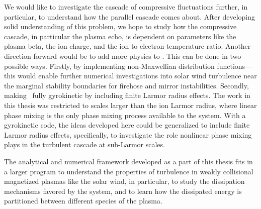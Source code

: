 We would like to investigate the cascade of compressive fluctuations further, in
particular, to understand how the parallel cascade comes about.
After developing solid understanding of this problem, we hope to study how the compressive cascade, in
particular the plasma echo, is dependent on parameters like the plasma beta, the ion
charge, and the ion to
electron temperature ratio. Another direction forward would be to add more physics to
\Gand. This can be done in two possible ways. Firstly, by implementing non-Maxwellian
distribution functions---this would enable 
further numerical investigations into solar wind turbulence near the marginal stability
boundaries for firehose and mirror instabilities. Secondly, making \Gand\ fully gyrokinetic
by including finite Larmor radius effects. The work in this thesis was restricted to
scales larger than the ion Larmor radius, where linear phase mixing is the only 
phase mixing process available to the system.
With a gyrokinetic code, the ideas developed here could be generalized to include finite
Larmor radius effects, specifically, to investigate the role nonlinear phase mixing
\cite{tatsuno09} plays in the turbulent cascade at sub-Larmor scales.

The analytical and numerical framework developed as a part of this thesis fits in a larger
program to understand the properties of turbulence in weakly collisional magnetized
plasmas like the solar wind, in particular, to study the dissipation mechanisms favored by
the system, and to learn how the dissipated energy is partitioned between different
species of the plasma.
